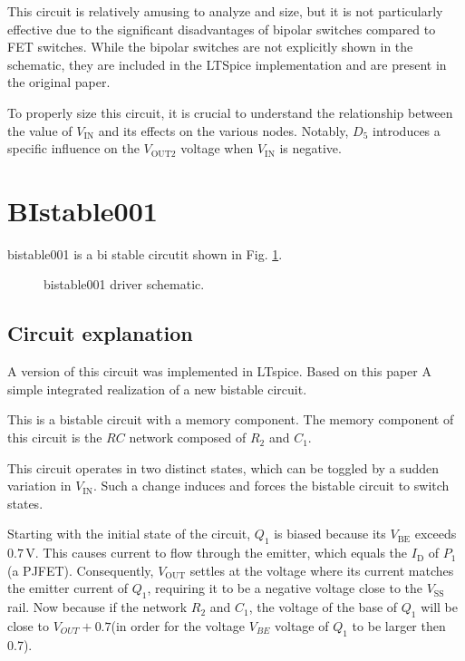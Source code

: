\documentclass[12pt]{article}
\begin{document}
This circuit is relatively amusing to analyze and size, but it is not particularly effective due to the significant disadvantages of bipolar switches compared to FET switches. While the bipolar switches are not explicitly shown in the schematic, they are included in the LTSpice implementation and are present in the original paper.  

To properly size this circuit, it is crucial to understand the relationship between the value of $V_{\text{IN}}$ and its effects on the various nodes. Notably, $D_5$ introduces a specific influence on the $V_{\text{OUT2}}$ voltage when $V_{\text{IN}}$ is negative.  


\newpage


\section{BIstable001}



bistable001 is a bi stable circutit shown in Fig. \ref{bistable001}. 

\begin{figure}[H]
        \centering
        
        \caption{bistable001 driver schematic.}
        \label{bistable001}
\end{figure}

\subsection{Circuit explanation}

A version of this circuit was implemented in LTspice.  
Based on this paper A simple integrated realization of a new bistable circuit.

This is a bistable circuit with a memory component. The memory component of this circuit is the $RC$ network composed of $R_2$ and $C_1$.  

This circuit operates in two distinct states, which can be toggled by a sudden variation in $V_{\text{IN}}$. Such a change induces and forces the bistable circuit to switch states.  

Starting with the initial state of the circuit, $Q_1$ is biased because its $V_{\text{BE}}$ exceeds $0.7 \, \text{V}$. This causes current to flow through the emitter, which equals the $I_{\text{D}}$ of $P_1$ (a PJFET). Consequently, $V_{\text{OUT}}$ settles at the voltage where its current matches the emitter current of $Q_1$, requiring it to be a negative voltage close to the $V_{\text{SS}}$ rail.  Now because if the network $R_2$ and $C_1$, the voltage of the base of $Q_1$ will be close to $V_{OUT} + 0.7$(in order for the voltage $V_{BE}$ voltage of $Q_1$ to be larger then 0.7).
\end{document}
